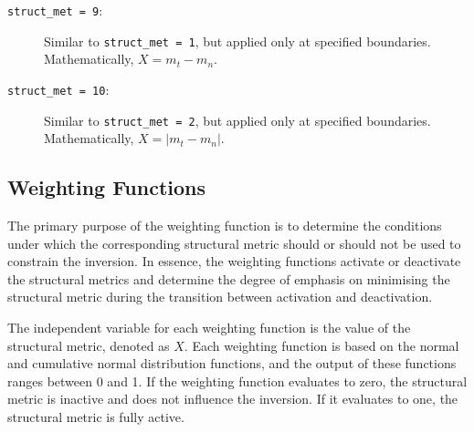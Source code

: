 \documentclass[a4paper,12pt]{article}
\begin{document}
\begin{description}
    \item[\texttt{struct\_met = 9}:] Similar to \texttt{struct\_met = 1}, but applied only at specified boundaries. Mathematically, \( X = m_t - m_n \).

    \item[\texttt{struct\_met = 10}:] Similar to \texttt{struct\_met = 2}, but applied only at specified boundaries. Mathematically, \( X = |m_t - m_n| \).
\end{description}

\subsection{Weighting Functions} \label{weighting_functions}

The primary purpose of the weighting function is to determine the conditions
under which the corresponding structural metric should or should not be used to
constrain the inversion. In essence, the weighting functions activate or
deactivate the structural metrics and determine the degree of emphasis on
minimising the structural metric during the transition between activation and
deactivation.

The independent variable for each weighting function is the value of the
structural metric, denoted as \(X\). Each weighting function is based on the
normal and cumulative normal distribution functions, and the output of these
functions ranges between 0 and 1. If the weighting function evaluates to zero,
the structural metric is inactive and does not influence the inversion. If it
evaluates to one, the structural metric is fully active.
\end{document}
